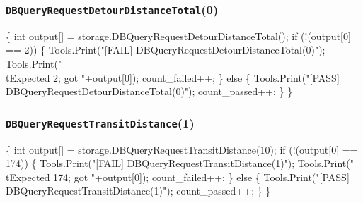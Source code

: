 \documentclass{article}
\def\nwendcode{\endtrivlist \endgroup}
\let\nwdocspar=\par
\begin{document}
\subsubsection{{\tt{}DBQueryRequestDetourDistanceTotal}(0)}
\nwenddocs{}\endmoddef{}
\{
  int output[] = storage.DBQueryRequestDetourDistanceTotal();
  if (!(output[0] == 2)) \{
    Tools.Print("[FAIL] DBQueryRequestDetourDistanceTotal(0)");
    Tools.Print("\\tExpected 2; got "+output[0]);
    count_failed++;
  \} else \{
    Tools.Print("[PASS] DBQueryRequestDetourDistanceTotal(0)");
    count_passed++;
  \}
\}
\nwendcode{}\nwdocspar
\subsubsection{{\tt{}DBQueryRequestTransitDistance}(1)}
\nwenddocs{}\endmoddef{}
\{
  int output[] = storage.DBQueryRequestTransitDistance(10);
  if (!(output[0] == 174)) \{
    Tools.Print("[FAIL] DBQueryRequestTransitDistance(1)");
    Tools.Print("\\tExpected 174; got "+output[0]);
    count_failed++;
  \} else \{
    Tools.Print("[PASS] DBQueryRequestTransitDistance(1)");
    count_passed++;
  \}
\}
\nwendcode{}\nwdocspar
\end{document}
